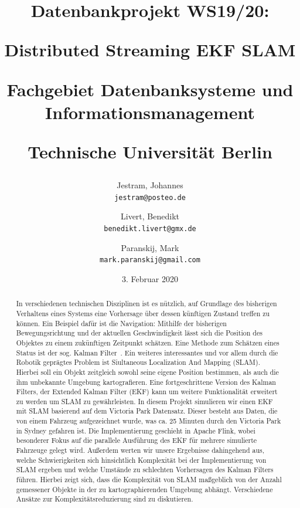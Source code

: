 \documentclass[11pt]{article}
\author{
  	Jestram, Johannes\\
  	\texttt{jestram@posteo.de}
	\and
	Livert, Benedikt\\
	\texttt{benedikt.livert@gmx.de}
	\and
	Paranskij, Mark\\
	\texttt{mark.paranskij@gmail.com}
}
\title{Datenbankprojekt WS19/20: \par Distributed Streaming EKF SLAM \medskip \par 
Fachgebiet Datenbanksysteme und Informationsmanagement \medskip \par Technische Universität Berlin}
\date{3. Februar 2020}
\begin{document}
\maketitle
\newpage

\tableofcontents
\newpage
\begin{abstract}
    In verschiedenen technischen Disziplinen ist es nützlich, auf Grundlage des bisherigen Verhaltens eines Systems eine Vorhersage über dessen künftigen Zustand treffen zu können. Ein Beispiel dafür ist die Navigation: Mithilfe der bisherigen Bewegungsrichtung und der aktuellen Geschwindigkeit lässt sich die Position des Objektes zu einem zukünftigen Zeitpunkt schätzen. Eine Methode zum Schätzen eines
    Status ist der sog. Kalman Filter~\cite{kalman1960new}. 
Ein weiteres interessantes und vor allem durch die Robotik geprägtes Problem ist Siultaneous Localization And Mapping (SLAM). Hierbei soll ein Objekt zeitgleich sowohl seine eigene Position bestimmen, als auch die ihm unbekannte Umgebung kartografieren. Eine fortgeschrittene Version des Kalman Filters, der Extended Kalman Filter (EKF) kann um weitere Funktionalität erweitert zu werden um SLAM zu gewährleisten. 
In diesem Projekt simulieren wir einen EKF mit SLAM\cite{freiburg_SLAM} basierend auf dem Victoria Park Datensatz. Dieser besteht aus Daten, die von einem Fahrzeug aufgezeichnet wurde, was ca. 25 Minuten durch den Victoria Park\cite{ute_SLAM} in Sydney gefahren ist. Die Implementierung geschieht in Apache Flink, wobei besonderer Fokus auf die parallele Ausführung des EKF für mehrere simulierte Fahrzeuge gelegt wird. Außerdem werten wir unsere Ergebnisse dahingehend aus, welche Schwierigkeiten sich hinsichtlich Komplexität bei der Implementierung von SLAM ergeben und welche Umstände zu schlechten Vorhersagen des Kalman Filters führen. Hierbei zeigt sich, dass die Komplexität von SLAM maßgeblich von der Anzahl gemessener Objekte in der zu kartographierenden Umgebung abhängt. Verschiedene Ansätze zur Komplexitätsreduzierung sind zu diskutieren. 
\end{abstract}
 
\end{document}
